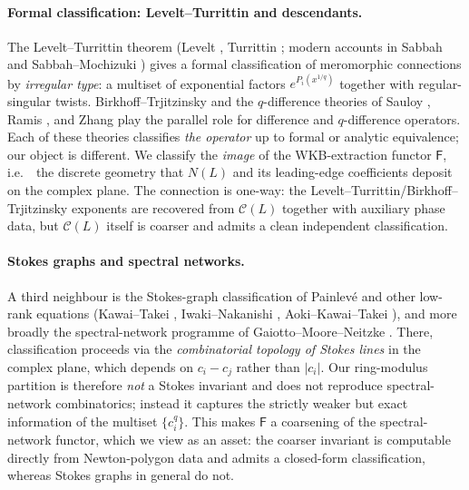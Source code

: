 \documentclass[aip,jmp,preprint,amsmath,amssymb,nofootinbib,floatfix]{revtex4-2}
\theoremstyle{plain}
\theoremstyle{definition}
\theoremstyle{remark}
\newcommand{\NL}{N(L)}
\newcommand{\Cl}{\mathcal{C}}
\newcommand{\Fclass}{\mathsf{F}}
\newcommand{\ie}{i.e.\ }
\begin{document}
\paragraph{Formal classification: Levelt--Turrittin and descendants.}
The Levelt--Turrittin theorem (Levelt \cite{levelt}, Turrittin
\cite{turrittin}; modern accounts in Sabbah \cite{sabbah-isomon} and
Sabbah--Mochizuki \cite{mochizuki-asymptotic}) gives a formal
classification of meromorphic connections by \emph{irregular type}: a
multiset of exponential factors $e^{P_i(x^{1/q})}$ together with
regular-singular twists. Birkhoff--Trjitzinsky \cite{birkhoff-trjitzinsky}
and the $q$-difference theories of Sauloy \cite{sauloy}, Ramis
\cite{ramis-stokes,ramis-q-stokes}, and Zhang \cite{zhang} play the
parallel role for difference and $q$-difference operators. Each of these
theories classifies \emph{the operator} up to formal or analytic
equivalence; our object is different. We classify the \emph{image} of
the WKB-extraction functor $\Fclass$, \ie\ the discrete geometry that
$\NL$ and its leading-edge coefficients deposit on the complex plane.
The connection is one-way: the Levelt--Turrittin/Birkhoff--Trjitzinsky
exponents are recovered from $\Cl(L)$ together with auxiliary phase data,
but $\Cl(L)$ itself is coarser and admits a clean independent
classification.

\paragraph{Stokes graphs and spectral networks.}
A third neighbour is the Stokes-graph classification of Painlev{\'e} and
other low-rank equations (Kawai--Takei \cite{kawai-takei},
Iwaki--Nakanishi \cite{iwaki-nakanishi}, Aoki--Kawai--Takei
\cite{aoki-kawai-takei}), and more broadly the spectral-network programme
of Gaiotto--Moore--Neitzke \cite{gmn-spectral}. There, classification
proceeds via the \emph{combinatorial topology of Stokes lines} in the
complex plane, which depends on $c_i - c_j$ rather than $|c_i|$. Our
ring-modulus partition is therefore \emph{not} a Stokes invariant and
does not reproduce spectral-network combinatorics; instead it captures
the strictly weaker but exact information of the multiset $\{c_i^q\}$.
This makes $\Fclass$ a coarsening of the spectral-network functor, which
we view as an asset: the coarser invariant is computable directly from
Newton-polygon data and admits a closed-form classification, whereas
Stokes graphs in general do not.
\end{document}
